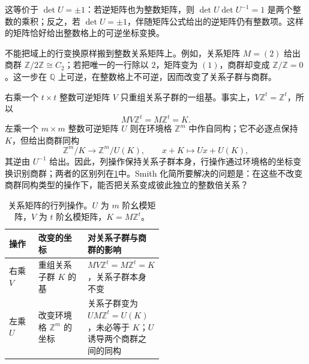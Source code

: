这等价于 \(\det U=\pm1\)：若逆矩阵也为整数矩阵，则 \(\det U\det U^{-1}=1\) 是两个整数的乘积；反之，若 \(\det U=\pm1\)，伴随矩阵公式给出的逆矩阵仍有整数项。这样的矩阵恰好给出整数格上的可逆坐标变换。

\ProseParagraphBreak
不能把域上的行变换原样搬到整数关系矩阵上。例如，关系矩阵 \(M=(2)\) 给出商群 \(\mathbb Z/2\mathbb Z\cong C_2\)；若把唯一的一行除以 \(2\)，矩阵变为 \((1)\)，商群却变成 \(\mathbb Z/\mathbb Z=0\)。这一步在 \(\mathbb Q\) 上可逆，在整数格上不可逆，因而改变了关系子群与商群。

\ProseParagraphBreak
右乘一个 \(t\times t\) 整数可逆矩阵 \(V\) 只重组关系子群的一组基。事实上，\(V\mathbb Z^t=\mathbb Z^t\)，所以
\[
	MV\mathbb Z^t=M\mathbb Z^t=K.
\]
左乘一个 \(m\times m\) 整数可逆矩阵 \(U\) 则在环境格 \(\mathbb Z^m\) 中作自同构；它不必逐点保持 \(K\)，但给出商群同构
\[
	\mathbb Z^m/K\longrightarrow\mathbb Z^m/U(K), \qquad x+K\longmapsto Ux+U(K),
\]
其逆由 \(U^{-1}\) 给出。因此，列操作保持关系子群本身，行操作通过环境格的坐标变换识别商群；两者的区别列在\cref{b1:tab:smith-row-column-operations}中。Smith 化简所要解决的问题是：在这些不改变商群同构类型的操作下，能否把关系变成彼此独立的整数倍关系？

\begin{table}[htbp]
	\centering
	\caption[关系矩阵的行列操作]{关系矩阵的行列操作。\(U\) 为 \(m\) 阶幺模矩阵，\(V\) 为 \(t\) 阶幺模矩阵，\(K=M\mathbb Z^t\)。}
	\label{b1:tab:smith-row-column-operations}
	\begin{tabularx}{\linewidth}{@{}>{\raggedright\arraybackslash}p{0.19\linewidth}>{\raggedright\arraybackslash}p{0.32\linewidth}>{\raggedright\arraybackslash}X@{}}
		\toprule
		操作 & 改变的坐标 & 对关系子群与商群的影响 \\
		\midrule
		右乘 \(V\) & 重组关系子群 \(K\) 的基 & \(MV\mathbb Z^t=M\mathbb Z^t=K\)，关系子群本身不变 \\
		\addlinespace
		左乘 \(U\) & 改变环境格 \(\mathbb Z^m\) 的坐标 & 关系子群变为 \(UM\mathbb Z^t=U(K)\)，未必等于 \(K\)；\(U\) 诱导两个商群之间的同构 \\
		\bottomrule
	\end{tabularx}
\end{table}

